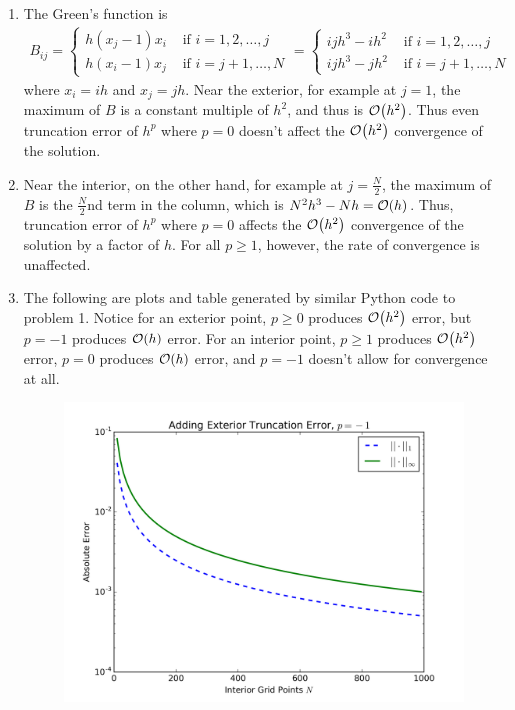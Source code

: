 \documentclass{article} %
\theoremstyle{plain}
\numberwithin{equation}{section} %
\numberwithin{figure}{section} %
\numberwithin{table}{section} %
\begin{document}
\begin{enumerate}[\ \ (a)]
    \item
        The Green's function is
        \begin{align}
            B_{ij} = \begin{cases}
                h(x_j - 1)x_i & \text{ if } i = 1,2,\dots, j \\
                h(x_i - 1)x_j & \text{ if } i = j+1,\dots, N
            \end{cases} = \begin{cases}
                ijh^3 - ih^2 & \text{ if } i = 1,2,\dots, j \\
                ijh^3 - jh^2 & \text{ if } i = j+1,\dots, N
            \end{cases}
        \end{align}
        where $x_i = ih$ and $x_j = jh$.  Near the exterior, for example at $j = 1$, the maximum of $B$ is a constant multiple of $h^2$, and thus is $\order{h^2}$.  Thus even truncation error of $h^p$ where $p = 0$ doesn't affect the $\order{h^2}$ convergence of the solution.
    \item
        Near the interior, on the other hand, for example at $j = \frac{N}{2}$, the maximum of $B$ is the $\frac{N}{2}$nd term in the column, which is $N^2h^3 - Nh = \order{h}$.  Thus, truncation error of $h^p$ where $p = 0$ affects the $\order{h^2}$ convergence of the solution by a factor of $h$.  For all $p \geq 1$, however, the rate of convergence is unaffected.
    \item
        The following are plots and table generated by similar Python code to problem 1.  Notice for an exterior point, $p \geq 0$ produces $\order{h^2}$ error, but $p = -1$ produces $\order{h}$ error.  For an interior point, $p \geq 1$ produces $\order{h^2}$ error, $p = 0$ produces $\order{h}$ error, and $p = -1$ doesn't allow for convergence at all.
        \begin{figure}[ht!]
            \begin{minipage}[b]{0.5\linewidth}
                \centering
                \includegraphics[width=\linewidth]{figure_2c1_ext_p=-1.png}

\end{minipage}
\end{figure}
\end{enumerate}
\end{document}
